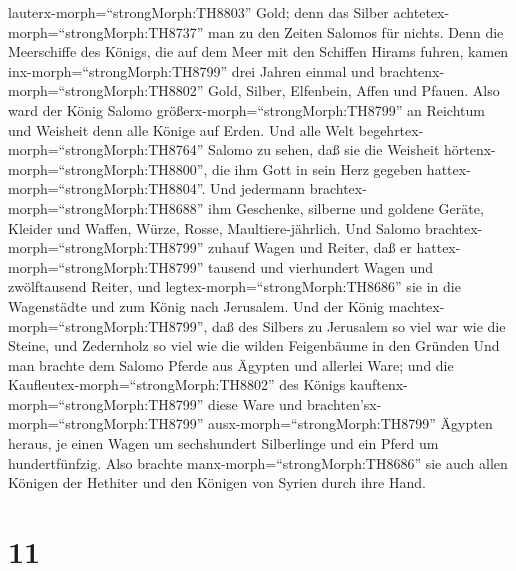 lauterx-morph=``strongMorph:TH8803'' Gold; denn das Silber
achtetex-morph=``strongMorph:TH8737'' man zu den Zeiten Salomos für
nichts.  Denn die Meerschiffe des Königs, die auf dem Meer
mit den Schiffen Hirams fuhren, kamen inx-morph=``strongMorph:TH8799''
drei Jahren einmal und brachtenx-morph=``strongMorph:TH8802'' Gold,
Silber, Elfenbein, Affen und Pfauen.  Also ward der König
Salomo größerx-morph=``strongMorph:TH8799'' an Reichtum und Weisheit
denn alle Könige auf Erden.  Und alle Welt
begehrtex-morph=``strongMorph:TH8764'' Salomo zu sehen, daß sie die
Weisheit hörtenx-morph=``strongMorph:TH8800'', die ihm Gott in sein Herz
gegeben hattex-morph=``strongMorph:TH8804''.  Und jedermann
brachtex-morph=``strongMorph:TH8688'' ihm Geschenke, silberne und
goldene Geräte, Kleider und Waffen, Würze, Rosse, Maultiere-jährlich.
 Und Salomo brachtex-morph=``strongMorph:TH8799'' zuhauf
Wagen und Reiter, daß er hattex-morph=``strongMorph:TH8799'' tausend und
vierhundert Wagen und zwölftausend Reiter, und
legtex-morph=``strongMorph:TH8686'' sie in die Wagenstädte und zum König
nach Jerusalem.  Und der König
machtex-morph=``strongMorph:TH8799'', daß des Silbers zu Jerusalem so
viel war wie die Steine, und Zedernholz so viel wie die wilden
Feigenbäume in den Gründen  Und man brachte dem Salomo
Pferde aus Ägypten und allerlei Ware; und die
Kaufleutex-morph=``strongMorph:TH8802'' des Königs
kauftenx-morph=``strongMorph:TH8799'' diese Ware  und
brachten'sx-morph=``strongMorph:TH8799''
ausx-morph=``strongMorph:TH8799'' Ägypten heraus, je einen Wagen um
sechshundert Silberlinge und ein Pferd um hundertfünfzig. Also brachte
manx-morph=``strongMorph:TH8686'' sie auch allen Königen der Hethiter
und den Königen von Syrien durch ihre Hand.

\hypertarget{section-10}{%
\section{11}\label{section-10}}

